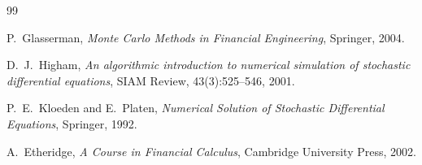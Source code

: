 \documentclass[11pt,a4paper]{article}
\theoremstyle{plain}
\theoremstyle{definition}
\theoremstyle{remark}
\begin{document}
\begin{thebibliography}{99}

P.\ Glasserman,
\emph{Monte Carlo Methods in Financial Engineering},
Springer, 2004.

D.\ J.\ Higham,
\emph{An algorithmic introduction to numerical simulation of
stochastic differential equations},
SIAM Review, 43(3):525--546, 2001.

P.\ E.\ Kloeden and E.\ Platen,
\emph{Numerical Solution of Stochastic Differential Equations},
Springer, 1992.

A.\ Etheridge,
\emph{A Course in Financial Calculus},
Cambridge University Press, 2002.

\end{thebibliography}
\end{document}

